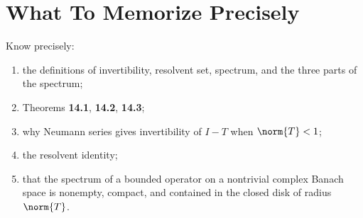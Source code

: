 \documentclass[11pt]{article}
\begin{document}
\section{What To Memorize Precisely}

\begin{focusbox}
Know precisely:
\begin{enumerate}
\item the definitions of invertibility, resolvent set, spectrum, and the three parts of the spectrum;
\item Theorems \textbf{14.1}, \textbf{14.2}, \textbf{14.3};
\item why Neumann series gives invertibility of $I-T$ when $\norm{T}<1$;
\item the resolvent identity;
\item that the spectrum of a bounded operator on a nontrivial complex Banach space is nonempty, compact, and contained in the closed disk of radius $\norm{T}$.
\end{enumerate}
\end{focusbox}
\end{document}
